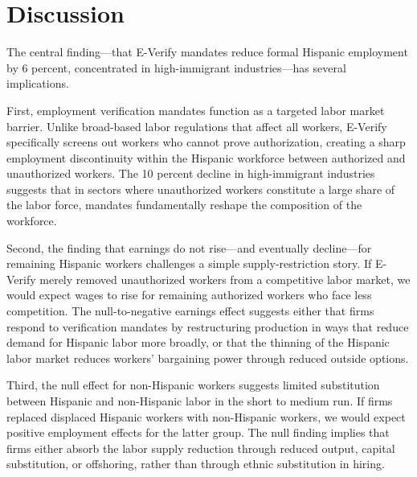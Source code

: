 \documentclass[12pt]{article}
\begin{document}
\section{Discussion}

The central finding---that E-Verify mandates reduce formal Hispanic employment by 6 percent, concentrated in high-immigrant industries---has several implications.

First, employment verification mandates function as a targeted labor market barrier. Unlike broad-based labor regulations that affect all workers, E-Verify specifically screens out workers who cannot prove authorization, creating a sharp employment discontinuity within the Hispanic workforce between authorized and unauthorized workers. The 10 percent decline in high-immigrant industries suggests that in sectors where unauthorized workers constitute a large share of the labor force, mandates fundamentally reshape the composition of the workforce.

Second, the finding that earnings do not rise---and eventually decline---for remaining Hispanic workers challenges a simple supply-restriction story. If E-Verify merely removed unauthorized workers from a competitive labor market, we would expect wages to rise for remaining authorized workers who face less competition. The null-to-negative earnings effect suggests either that firms respond to verification mandates by restructuring production in ways that reduce demand for Hispanic labor more broadly, or that the thinning of the Hispanic labor market reduces workers' bargaining power through reduced outside options.

Third, the null effect for non-Hispanic workers suggests limited substitution between Hispanic and non-Hispanic labor in the short to medium run. If firms replaced displaced Hispanic workers with non-Hispanic workers, we would expect positive employment effects for the latter group. The null finding implies that firms either absorb the labor supply reduction through reduced output, capital substitution, or offshoring, rather than through ethnic substitution in hiring.
\end{document}

